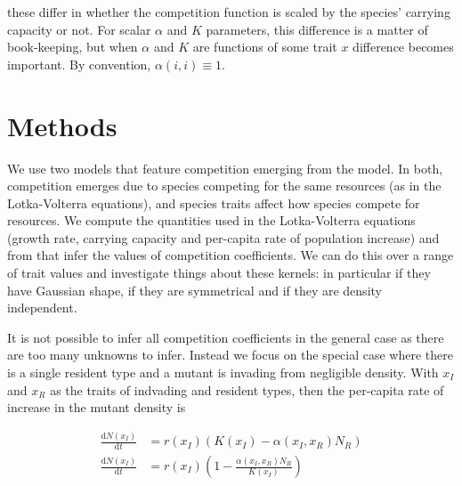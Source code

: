 \documentclass[a4paper,11pt]{article}
\newcommand{\ud}{\ensuremath{\mathrm{d}}}
\begin{document}
these differ in whether the competition function is scaled by the
species' carrying capacity or not.  For scalar $\alpha$ and $K$
parameters, this difference is a matter of book-keeping, but when
$\alpha$ and $K$ are functions of some trait $x$ difference becomes
important.  By convention, $\alpha(i, i) \equiv 1$.

\section{Methods}

%
We use two models that feature competition emerging from the model.
In both, competition emerges due to species competing for the same
resources (as in the Lotka-Volterra equations), and species traits
affect how species compete for resources.  We compute the quantities
used in the Lotka-Volterra equations (growth rate, carrying capacity
and per-capita rate of population increase) and from that infer the
values of competition coefficients.
We can do this over a range of trait values and investigate things
about these kernels: in particular if they have Gaussian shape, if
they are symmetrical and if they are density independent.

It is not possible to infer all competition coefficients in the
general case as there are too many unknowns to infer.  Instead we
focus on the special case where there is a single resident type and a
mutant is invading from negligible density.  With $x_I$ and $x_R$ as
the traits of indvading and resident types, then the per-capita rate
of increase in the mutant density is

\begin{subequations}
  \label{eq:LVi}
  \begin{align}
    \frac{\ud N(x_I)}{\ud t} &=
    r(x_I)\left(K(x_I) - \alpha(x_I, x_R) N_R\right)\\
    \frac{\ud N(x_I)}{\ud t} &=
    r(x_I)\left(1 - \frac{\alpha(x_I, x_R) N_R}{K(x_I)}\right)
  \end{align}
\end{subequations}
\end{document}
